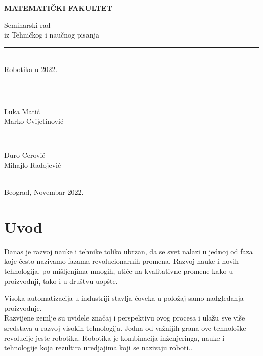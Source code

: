 \documentclass{report}
\newcommand{\HRule}{\rule{\linewidth}{0.5mm}}
\begin{document}
	\vspace*{5cm}
	\thispagestyle{empty}
	\centerline{\huge \textbf{MATEMATIČKI FAKULTET}}
	\vspace{2cm}
	
	\begin{center}
		
		{\Large Seminarski rad}\\
		{\Large	iz Tehničkog i naučnog pisanja}\\
		\Huge\HRule\\[0.4cm] %
		{Robotika u 2022.}\\
		\HRule \\[20pt] %
		\begin{minipage}{0.4\textwidth}
			\begin{flushleft} \large
				{\Large Luka Matić}\\
				{\Large Marko Cvijetinović}
			\end{flushleft}
		\end{minipage}
		~
		\begin{minipage}{0.4\textwidth}
			\begin{flushright} \large
				{\Large Đuro Cerović} \\
				{\Large Mihajlo Radojević}\\ 
			\end{flushright}
		\end{minipage}\\[5cm]
		\Large{Beograd, Novembar 2022.}
	\end{center}
	
	\tableofcontents
	\chapter{Uvod}
	
	Danas je razvoj nauke i tehnike toliko ubrzan, da se svet nalazi u jednoj od faza koje često nazivamo fazama revolucionarnih promena. Razvoj nauke i novih tehnologija, po mišljenjima mnogih, utiče na kvalitativne promene kako u proizvodnji, tako i u društvu uopšte.
	
	Visoka automatizacija u industriji stavlja čoveka u položaj samo nadgledanja proizvodnje.\\
	Razvijene zemlje su uvidele značaj i perspektivu ovog procesa i ulažu sve više sredstava u razvoj visokih tehnologija. Jedna od važnijih grana ove tehnološke revolucije jeste robotika. Robotika je kombinacija inženjeringa, nauke i tehnologije koja rezultira uredjajima koji se nazivaju roboti..\cite{robotics2022,robots2022}
	
\end{document}
